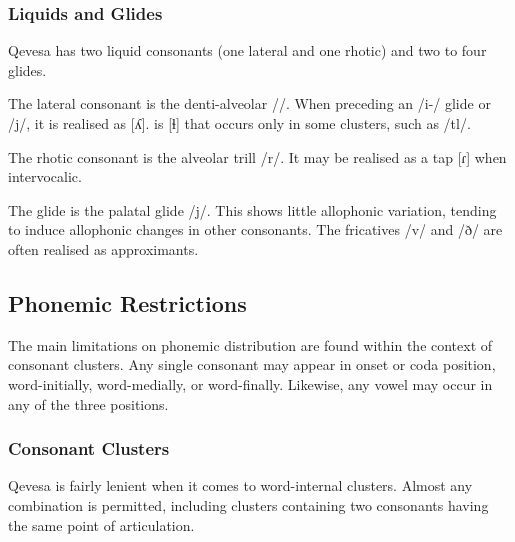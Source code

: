 \documentclass[grammar]{subfiles}
\begin{document}

  \subsubsection{Liquids and Glides}
  \label{sssec:liquids}

  Qevesa has two liquid consonants (one lateral and one rhotic) and two to four glides.

  The lateral consonant is the denti-alveolar //. When
  preceding an /i-/ glide or /j/, it is realised as [ʎ].  %
  is [ɬ] that occurs only in some clusters, such as /tl/.

  The rhotic consonant is the alveolar trill /r/.  It may be realised as a tap [ɾ] when intervocalic.  

  The glide is the palatal glide /j/.  This shows little allophonic variation,
  tending to induce allophonic changes in other consonants.  The fricatives /v/
  and /ð/ are often realised as approximants.  

  \subsection{Phonemic Restrictions}
  \label{ssec:phonemic_restrictions}

  The main limitations on phonemic distribution are found within the context of
  consonant clusters.  Any single consonant may appear in onset or coda
  position, word-initially, word-medially, or word-finally.  Likewise, any
  vowel may occur in any of the three positions. 

  \subsubsection{Consonant Clusters}
  \label{sssec:consonant_clusters}

  Qevesa is fairly lenient when it comes to word-internal clusters.  Almost any
  combination is permitted, including clusters containing two consonants having
  the same point of articulation. 

\end{document}
